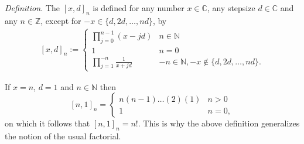 \documentclass[12pt]{article}
\begin{document}
\emph{Definition.}
The  $[x,d]_n$ is defined for any number $x \in \mathbb{C}$, any stepsize $d \in \mathbb{C}$ and any  $n \in \mathbb{Z}$, except for $-x \in \{ d,2d,\dots,nd \}$, by
\begin{eqnarray*}
\displaystyle [x,d]_n := \begin{cases} \prod_{j=0}^{n-1}(x-jd) & n \in \mathbb{N}\\
1 & n = 0 \\
\prod_{j=1}^{-n}\frac{1}{x+jd} & -n \in \mathbb{N}, -x \notin \{ d,2d,\dots,nd \}.
\end{cases}
\end{eqnarray*}
 
If $x = n$, $d = 1$ and $n \in \mathbb{N}$ then 
\[
\displaystyle [n,1]_n = \begin{cases} n(n-1)\dots(2)(1) & n > 0 \\
1 & n = 0, \end{cases}
\]
on which it follows that $[n,1]_n = n!$. This is why the above definition generalizes the notion of the usual factorial.
\end{document}

